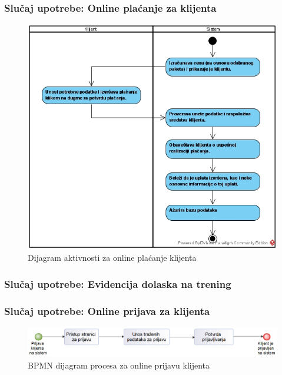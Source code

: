 \documentclass[a4paper]{article}
\begin{document}
\subsubsection{Slučaj upotrebe: Online plaćanje za klijenta}

\begin{figure}[!ht]
\begin{center}
\includegraphics[scale=0.55]{sections/images/dijagram_aktivnosti_za_online_placanje_klijenta.jpg}
\end{center}
\caption{Dijagram aktivnosti za online plaćanje klijenta}
\label{fig:kontekst}
\end{figure}

\subsubsection{Slučaj upotrebe: Evidencija dolaska na trening}


\subsubsection{Slučaj upotrebe: Online prijava za klijenta}

\begin{figure}[!ht]
\begin{center}
\includegraphics[scale=0.55]{sections/images/bpmn_dijagram_procesa_online_prijava_klijenta_na_sistem.png}
\end{center}
\caption{BPMN dijagram procesa za online prijavu klijenta}
\label{fig:kontekst}
\end{figure}
\end{document}
